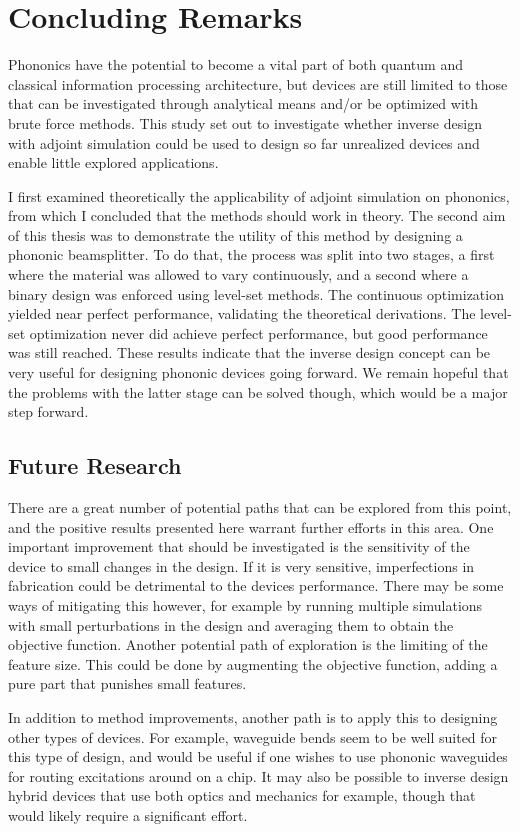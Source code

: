 \chapter{Concluding Remarks}

Phononics have the potential to become a vital part of both quantum  and
classical information processing architecture, but devices are still limited to
those that can be investigated through analytical means and/or be optimized with
brute force methods. This study set out to investigate whether inverse design
with adjoint simulation could be used to design so far unrealized devices and
enable little explored applications.

I first examined theoretically the applicability of adjoint simulation on
phononics, from which I concluded that the methods should work in theory.
The second aim of this thesis was to demonstrate the utility of this method by
designing a phononic beamsplitter.
To do that, the process was split into two stages, a first where the material
was allowed to vary continuously, and a second where a binary design was
enforced using level-set methods.
The continuous optimization yielded near perfect performance, validating the
theoretical derivations.
The level-set optimization never did achieve perfect performance, but
good performance was still reached.
These results indicate that the inverse design concept can be very useful for
designing phononic devices going forward.
We remain hopeful that the problems with the latter stage can be solved
though, which would be a major step forward.

\section{Future Research}

There are a great number of potential paths that can be explored from this
point, and the positive results presented here warrant further efforts in this
area.
One important improvement that should be investigated is the sensitivity of the
device to small changes in the design.
If it is very sensitive, imperfections in fabrication could be detrimental to
the devices performance.
There may be some ways of mitigating this however, for example by running
multiple simulations with small perturbations in the design and averaging them
to obtain the objective function.
Another potential path of exploration is the limiting of the feature size.
This could be done by augmenting the objective function, adding
a pure part that punishes small features.

In addition to method improvements, another path is to apply this to designing
other types of devices. For example, waveguide bends seem to be well suited for
this type of design, and would be useful if one wishes to use phononic
waveguides for routing excitations around on a chip. It may also be possible to
inverse design hybrid devices that use both optics and mechanics for example,
though that would likely require a significant effort.
